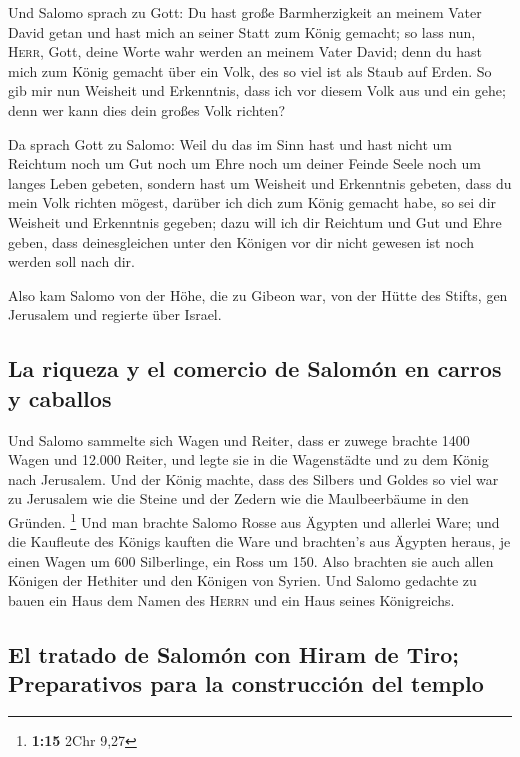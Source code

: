 Und Salomo sprach zu Gott: Du hast große Barmherzigkeit
an meinem Vater David getan und hast mich an seiner Statt zum König
gemacht;  so lass nun, \textsc{Herr}, Gott, deine Worte
wahr werden an meinem Vater David; denn du hast mich zum König gemacht
über ein Volk, des so viel ist als Staub auf Erden.  So
gib mir nun Weisheit und Erkenntnis, dass ich vor diesem Volk aus und
ein gehe; denn wer kann dies dein großes Volk richten?

 Da sprach Gott zu Salomo: Weil du das im Sinn hast und
hast nicht um Reichtum noch um Gut noch um Ehre noch um deiner Feinde
Seele noch um langes Leben gebeten, sondern hast um Weisheit und
Erkenntnis gebeten, dass du mein Volk richten mögest, darüber ich dich
zum König gemacht habe,  so sei dir Weisheit und
Erkenntnis gegeben; dazu will ich dir Reichtum und Gut und Ehre geben,
dass deinesgleichen unter den Königen vor dir nicht gewesen ist noch
werden soll nach dir.

 Also kam Salomo von der Höhe, die zu Gibeon war, von der
Hütte des Stifts, gen Jerusalem und regierte über Israel.

\hypertarget{la-riqueza-y-el-comercio-de-salomuxf3n-en-carros-y-caballos}{%
\subsection{La riqueza y el comercio de Salomón en carros y
caballos}\label{la-riqueza-y-el-comercio-de-salomuxf3n-en-carros-y-caballos}}

 Und Salomo sammelte sich Wagen und Reiter, dass er
zuwege brachte 1400 Wagen und 12.000 Reiter, und legte sie in die
Wagenstädte und zu dem König nach Jerusalem.  Und der
König machte, dass des Silbers und Goldes so viel war zu Jerusalem wie
die Steine und der Zedern wie die Maulbeerbäume in den Gründen.
\footnote{\textbf{1:15} 2Chr 9,27}  Und man brachte
Salomo Rosse aus Ägypten und allerlei Ware; und die Kaufleute des Königs
kauften die Ware  und brachten's aus Ägypten heraus, je
einen Wagen um 600 Silberlinge, ein Ross um 150. Also brachten sie auch
allen Königen der Hethiter und den Königen von Syrien. 
Und Salomo gedachte zu bauen ein Haus dem Namen des \textsc{Herrn} und
ein Haus seines Königreichs.

\hypertarget{el-tratado-de-salomuxf3n-con-hiram-de-tiro-preparativos-para-la-construcciuxf3n-del-templo}{%
\subsection{El tratado de Salomón con Hiram de Tiro; Preparativos para
la construcción del
templo}\label{el-tratado-de-salomuxf3n-con-hiram-de-tiro-preparativos-para-la-construcciuxf3n-del-templo}}

